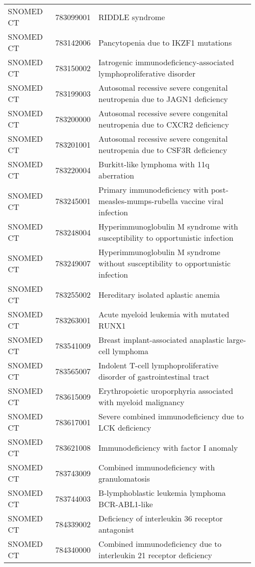 \begin{longtable}{p{}p{}p{}}
  SNOMED CT & 783099001 & RIDDLE syndrome \\ 
  SNOMED CT & 783142006 & Pancytopenia due to IKZF1 mutations \\ 
  SNOMED CT & 783150002 & Iatrogenic immunodeficiency-associated lymphoproliferative disorder \\ 
  SNOMED CT & 783199003 & Autosomal recessive severe congenital neutropenia due to JAGN1 deficiency \\ 
  SNOMED CT & 783200000 & Autosomal recessive severe congenital neutropenia due to CXCR2 deficiency \\ 
  SNOMED CT & 783201001 & Autosomal recessive severe congenital neutropenia due to CSF3R deficiency \\ 
  SNOMED CT & 783220004 & Burkitt-like lymphoma with 11q aberration \\ 
  SNOMED CT & 783245001 & Primary immunodeficiency with post-measles-mumps-rubella vaccine viral infection \\ 
  SNOMED CT & 783248004 & Hyperimmunoglobulin M syndrome with susceptibility to opportunistic infection \\ 
  SNOMED CT & 783249007 & Hyperimmunoglobulin M syndrome without susceptibility to opportunistic infection \\ 
  SNOMED CT & 783255002 & Hereditary isolated aplastic anemia \\ 
  SNOMED CT & 783263001 & Acute myeloid leukemia with mutated RUNX1 \\ 
  SNOMED CT & 783541009 & Breast implant-associated anaplastic large-cell lymphoma \\ 
  SNOMED CT & 783565007 & Indolent T-cell lymphoproliferative disorder of gastrointestinal tract \\ 
  SNOMED CT & 783615009 & Erythropoietic uroporphyria associated with myeloid malignancy \\ 
  SNOMED CT & 783617001 & Severe combined immunodeficiency due to LCK deficiency \\ 
  SNOMED CT & 783621008 & Immunodeficiency with factor I anomaly \\ 
  SNOMED CT & 783743009 & Combined immunodeficiency with granulomatosis \\ 
  SNOMED CT & 783744003 & B-lymphoblastic leukemia lymphoma BCR-ABL1-like \\ 
  SNOMED CT & 784339002 & Deficiency of interleukin 36 receptor antagonist \\ 
  SNOMED CT & 784340000 & Combined immunodeficiency due to interleukin 21 receptor deficiency \\ 

\end{longtable}
